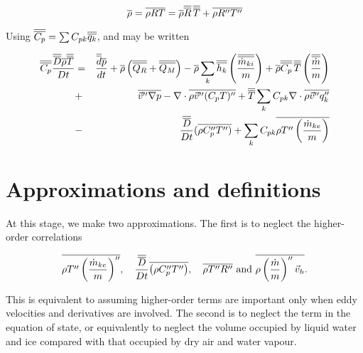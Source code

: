 \begin{equation}
\overline{\rho}= \overline{\rho RT}= \overline{\rho}\overline{\overline{R}}\,\overline{\overline{T}}+
\overline{\rho R''T''}\label{A.4.6}
\end{equation}

Using $\overline{\overline{C_{p}}}=\sum C_{pk}\overline{\overline{q_{k}}}$, 
and  may be written

\begin{eqnarray}
\overline{\overline{C_{p}}} \frac{\overline{\overline{D}}\overline{\rho}\overline{\overline{T}}}{Dt}&=&
\frac{\overline{\overline{d}}\overline{p}}{dt}+\overline{\rho}
\left(\overline{\overline{Q_{R}}}+\overline{\overline{Q_{M}}}\right)-\overline{\rho}\sum_{k}\overline{\overline{h_{k}}}
\left(\frac{\overline{\overline{\dot{m}_{ki}}}}{m}\right)+\overline{\rho}\overline{\overline{C_p}}\,
\overline{\overline{T}}\left(\frac{\overline{\overline{\dot{m}}}}{m}\right)\nonumber\\
&+&\overline{\vec{v}'' \nabla p}-\nabla \cdot
\overline{\rho\vec{v}''(C_{p}T)''}+\overline{\overline{T}}\sum_{k}C_{pk}\nabla \cdot
\overline{\rho\vec{v}''q_{k}''}\\
&-&\frac{\overline{\overline{D}}}{Dt} (\overline{\rho C_{p}''T'')}+\sum_{k}C_{pk}
\overline{\rho T''\left(\frac{\dot{m}_{ke}}{m}\right)}\nonumber
\end{eqnarray}


\section{Approximations and definitions}\label{sA.5}

At this stage, we make two
approximations. The first is to neglect the higher-order correlations

\begin{equation*}
\overline{\rho
T''\left(\frac{\dot{m}_{ke}}{m}\right)''},\quad\frac{\overline{\overline{D}}}{Dt}
\overline{\left(\rho C_{p}''T''\right)}, \quad \overline{\rho T'' R''}\mbox{
and } \overline{\rho\left(\frac{\dot{m}}{m}\right)''\vec{v}_{h}}.
\end{equation*}

This is equivalent to assuming higher-order terms are important only
when eddy velocities and derivatives are involved. The second is to
neglect the term in the equation of state, or equivalently to neglect
the volume occupied by liquid water and ice compared with that
occupied by dry air and water vapour.

